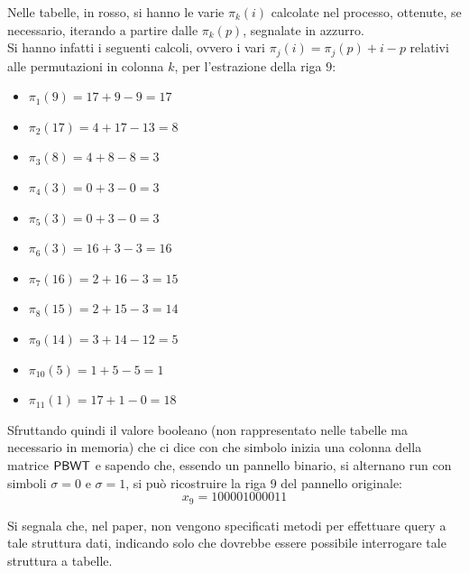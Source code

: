 \begin{esempio}
\begin{figure}[H]
  \end{figure}
  Nelle tabelle, in rosso, si hanno le varie $\pi_k(i)$ calcolate nel processo,
  ottenute, 
  se necessario, iterando a partire dalle $\pi_k(p)$, segnalate in azzurro. \\
  Si hanno infatti i seguenti calcoli, ovvero i vari $\pi_j(i)=\pi_j(p)+i-p$ 
  relativi alle permutazioni in colonna $k$, per l'estrazione della riga $9$:
  \begin{multicols}{2}
    \begin{itemize}
      \item $\pi_1(9)=17+9-9=17$
      \item $\pi_2(17)=4+17-13=8$
      \item $\pi_3(8)=4+8-8=3$
      \item $\pi_4(3)=0+3-0=3$
      \item $\pi_5(3)=0+3-0=3$
      \item $\pi_6(3)=16+3-3=16$
      \item $\pi_7(16)=2+16-3=15$
      \item $\pi_8(15)=2+15-3=14$
      \item $\pi_9(14)=3+14-12=5$
      \item $\pi_{10}(5)=1+5-5=1$
      \item $\pi_{11}(1)=17+1-0=18$
    \end{itemize}
  \end{multicols}
  Sfruttando quindi il valore booleano (non rappresentato nelle tabelle ma
  necessario in memoria) che ci dice con che simbolo inizia una colonna
  della matrice $\mbox{\rm {\sf PBWT}}$ e
  sapendo che, 
  essendo un pannello binario, si alternano run con simboli $\sigma=0$ e
  $\sigma=1$, si può ricostruire la riga 9 del pannello originale:
  \[x_9=100001000011\]
\end{esempio}
Si segnala che, nel paper, non vengono specificati metodi per
effettuare query a 
tale struttura dati, indicando solo che dovrebbe essere possibile interrogare
tale struttura a tabelle.
